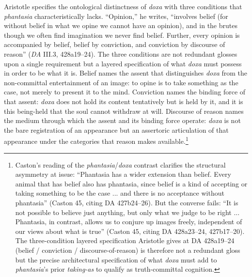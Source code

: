\documentclass{article}
\begin{document}
Aristotle specifies the ontological distinctness of \textit{doxa} with three conditions that \textit{phantasia} characteristically lacks. ``Opinion,'' he writes, ``involves belief (for without belief in what we opine we cannot have an opinion), and in the brutes though we often find imagination we never find belief. Further, every opinion is accompanied by belief, belief by conviction, and conviction by discourse of reason'' (\textit{DA} III.3, 428a19--24). The three conditions are not redundant glosses upon a single requirement but a layered specification of what \textit{doxa} must possess in order to be what it is. Belief names the assent that distinguishes \textit{doxa} from the non-committal entertainment of an image: to opine is to take something as the case, not merely to present it to the mind. Conviction names the binding force of that assent: \textit{doxa} does not hold its content tentatively but is held by it, and it is this being-held that the soul cannot withdraw at will. Discourse of reason names the medium through which the assent and its binding force operate: \textit{doxa} is not the bare registration of an appearance but an assertoric articulation of that appearance under the categories that reason makes available.\footnote{Caston's reading of the \textit{phantasia}/\textit{doxa} contrast clarifies the structural asymmetry at issue: ``Phantasia has a wider extension than belief. Every animal that has belief also has phantasia, since belief is a kind of accepting or taking something to be the case ... and there is no acceptance without phantasia'' (Caston 45, citing DA 427b24--26). But the converse fails: ``It is not possible to believe just anything, but only what we judge to be right ... Phantasia, in contrast, allows us to conjure up images freely, independent of our views about what is true'' (Caston 45, citing DA 428a23--24, 427b17--20). The three-condition layered specification Aristotle gives at DA 428a19--24 (belief / conviction / discourse-of-reason) is therefore not a redundant gloss but the precise architectural specification of what \textit{doxa} must add to \textit{phantasia}'s prior \textit{taking-as} to qualify as truth-committal cognition.}
\end{document}
